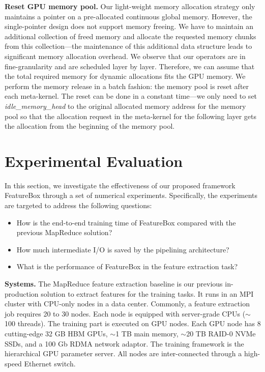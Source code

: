 \documentclass[conference]{IEEEtran}
\begin{document}
\textbf{Reset GPU memory pool.} 
Our light-weight memory allocation strategy only maintains a pointer on a pre-allocated continuous global memory. However, the single-pointer design does not support memory freeing. 
We have to maintain an additional collection of freed memory and allocate the requested memory chunks from this collection---the maintenance of this additional data structure leads to significant memory allocation overhead. 
We observe that our operators are in fine-granularity and are scheduled layer by layer. Therefore, we can assume that the total required memory for dynamic allocations fits the GPU memory. We perform the memory release in a batch fashion: the memory pool is reset after each meta-kernel. The reset can be done in a constant time---we only need to set \textit{idle\_memory\_head} to the original allocated memory address for the memory pool so that the allocation request in the meta-kernel for the following layer gets the allocation from the beginning of the memory pool.



\section{Experimental Evaluation}
In this section, we investigate the effectiveness of our proposed framework FeatureBox through a set of numerical experiments. 
Specifically, the experiments are targeted to address the following questions:
\begin{itemize}
\item How is the end-to-end training time of FeatureBox compared with the previous MapReduce solution?
\item How much intermediate I/O is saved by the pipelining architecture?
\item What is the performance of FeatureBox in the feature extraction task?
\end{itemize}

\textbf{Systems.} 
The MapReduce feature extraction baseline is our previous in-production solution to extract features for the training tasks. It runs in an MPI cluster with CPU-only nodes in a data center. Commonly, a feature extraction job requires 20 to 30 nodes. Each node is equipped with server-grade CPUs ($\sim$100 threads). The training part is executed on GPU nodes. Each GPU node has 8 cutting-edge 32 GB HBM GPUs, $\sim$1 TB main memory, $\sim$20 TB RAID-0 NVMe SSDs, and a 100 Gb RDMA network adaptor. The training framework is the hierarchical GPU parameter server.
All nodes are inter-connected through a high-speed Ethernet switch. 
\end{document}
